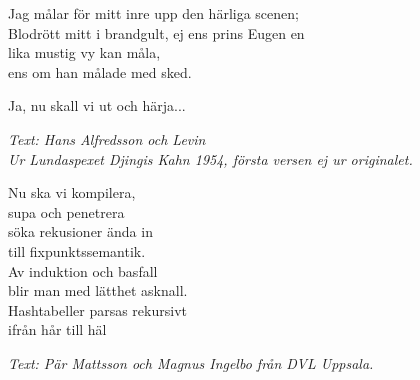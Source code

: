 Jag målar för mitt inre upp den härliga scenen;\\
Blodrött mitt i brandgult, ej ens prins Eugen en\\
lika mustig vy kan måla, \\
ens om han målade med sked.\par
\vspace{10pt}
Ja, nu skall vi ut och härja...\par
\vspace{10pt}
{\footnotesize\textit{Text: Hans Alfredsson och Levin\\
Ur Lundaspexet Djingis Kahn 1954, första versen ej ur originalet.}}\par
\vspace{10pt}
Nu ska vi kompilera,\\
supa och penetrera\\
söka rekusioner ända in\\
till fixpunktssemantik.\\
Av induktion och basfall\\
blir man med lätthet asknall.\\
Hashtabeller parsas rekursivt\\
ifrån hår till häl\par
\vspace{10pt}
{\footnotesize\textit{Text: Pär Mattsson och Magnus Ingelbo från DVL
    Uppsala.}}
